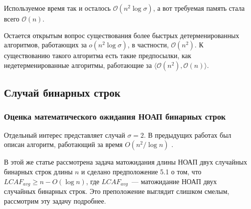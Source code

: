 Используемое время так и осталось $\mathcal{O}(n^2 \log \sigma)$, а вот требуемая память стала всего $\mathcal{O}(n)$.

Остается открытым вопрос существования более быстрых детерменированных алгоритмов, работающих за $o(n^2 \log \sigma)$, в частности, $\mathcal{O}(n^2)$. К существованию такого алгоритма есть такие предпосылки, как недетерменированные алгоритмы, работающие за $\langle \mathcal{O}(n^2), \mathcal{O}(n) \rangle$.

\subsection{Случай бинарных строк}

\subsubsection{Оценка математического ожидания НОАП бинарных строк}
Отдельный интерес представляет случай $\sigma=2$. В предыдущих работах был описан алгоритм, работающий за время $O(n^2/\log n)$ \cite{1}.

В этой же статье рассмотрена задача матожидания длины НОАП двух случайных бинарных строк длины $n$ и сделано предположение 5.1 о том, что $LCAF_{avg} \ge n - O(\log n)$, где $LCAF_{avg}$~--- матожидание НОАП двух случайных бинарных строк. Это преположение выглядит слишком смелым, рассмотрим эту задачу подробнее.


